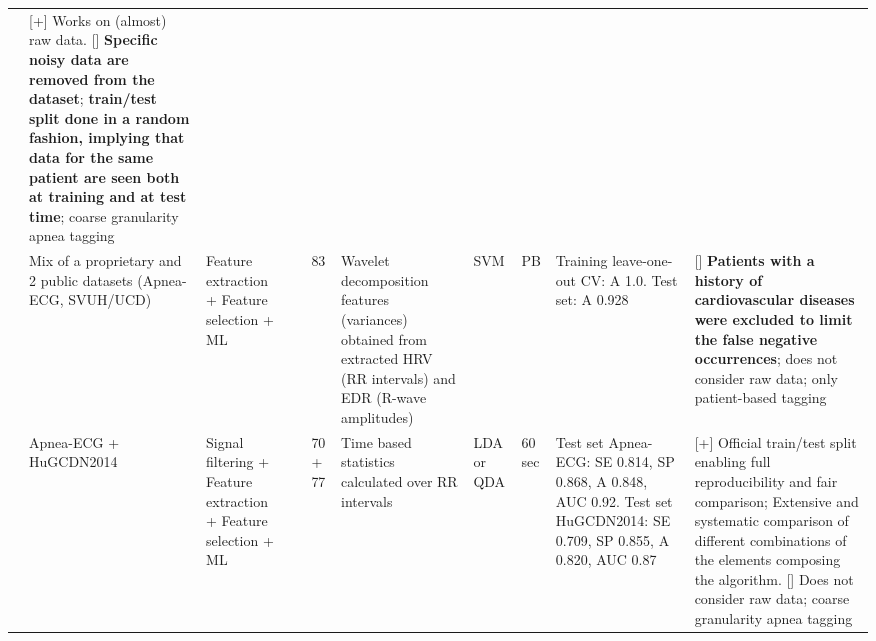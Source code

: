 \documentclass[5p,twocolumn,lefttitle]{elsarticle}
\begin{document}
\begin{table*}[!ht]
{\begin{tabularx}{2\textwidth}{@{}m{2.5em}p{7em}p{10em}lp{2em}p{12em}p{7em}p{3em}p{17em}X@{}}
                            & [+] Works on (almost) raw data. [] \textbf{Specific noisy data are removed from the dataset}; \textbf{train/test split done in a random fashion, implying that data for the same patient are seen both at training and at test time}; coarse granularity apnea tagging                                                                                                                                                                                                                                                         \\
            \cmidrule(l){2-10} 
                            & Mix of a proprietary and 2 public datasets (Apnea-ECG, SVUH/UCD) & Feature extraction + Feature selection + ML                    & \cite{DBLP:journals/titb/KhandokerPK09}  & 83            & Wavelet decomposition features (variances) obtained from extracted HRV (RR intervals) and EDR (R-wave amplitudes) & SVM                                 & PB                                & Training leave-one-out CV: A 1.0. Test set: A 0.928                                                                                                                                    & [] \textbf{Patients with a history of cardiovascular diseases were excluded to limit the false negative occurrences}; does not consider raw data; only patient-based tagging                                                                                                                                                                                                                                                       \\
            \cmidrule(l){2-10} 
                            & Apnea-ECG + HuGCDN2014                                  & Signal filtering + Feature extraction + Feature selection + ML & \cite{martin2017heart}                   & 70 + 77       & Time based statistics calculated over RR intervals                                                                & LDA or QDA                          & 60 sec                                     & Test set Apnea-ECG: SE 0.814, SP 0.868, A 0.848, AUC 0.92. Test set HuGCDN2014: SE 0.709, SP 0.855, A 0.820, AUC 0.87                                                                  & [+] Official train/test split enabling full reproducibility and fair comparison; Extensive and systematic comparison of different combinations of the elements composing the algorithm. [] Does not consider raw data; coarse granularity apnea tagging                                                                                                                                                                                               \\

\end{tabularx}}
\end{table*}
\end{document}
